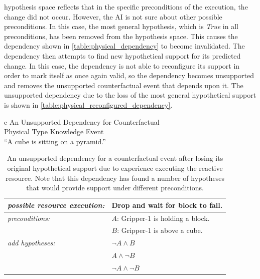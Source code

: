 hypothesis space reflects that in the specific preconditions of the
execution, the change did not occur.  However, the AI is not sure
about other possible preconditions.  In this case, the most general
hypothesis, which is \emph{True} in all preconditions, has been
removed from the hypothesis space.  This causes the dependency shown
in {\mbox{\autoref{table:physical_dependency}}} to become invalidated.
The dependency then attempts to find new hypothetical support for its
predicted change.  In this case, the dependency is not able to
reconfigure its support in order to mark itself as once again valid,
so the dependency becomes unsupported and removes the unsupported
counterfactual event that depends upon it.  The unsupported dependency
due to the loss of the most general hypothetical support is shown in
{\mbox{\autoref{table:physical_reconfigured_dependency}}}.
\begin{table}[h]
\centering
\begin{tabular}{c}
  An Unsupported Dependency for Counterfactual \\
  Physical Type Knowledge Event \\
  ``A cube is sitting on a pyramid.'' \\
  \begin{tabular}{|p{3cm}|p{6cm}|}
    \hline
    \emph{possible resource execution:} & Drop and wait for block to fall. \\
    \hline
    \emph{preconditions:}               & $A$: Gripper-1 is holding a block. \\
                                        & $B$: Gripper-1 is above a cube. \\
    \hline
    \emph{add hypotheses:}              & ${\neg}A \wedge B$ \\
                                        & $A \wedge {\neg}B$ \\
                                        & ${\neg}A \wedge {\neg}B$ \\
    \hline
  \end{tabular}
\end{tabular}
\caption[An unsupported dependency for a counterfactual physical type
  knowledge event after losing its original hypothetical support and
  attempting to reconfigure new support.]{An unsupported dependency
  for a counterfactual event after losing its original hypothetical
  support due to experience executing the reactive resource.  Note
  that this dependency has found a number of hypotheses that would
  provide support under different preconditions.}
\label{table:physical_reconfigured_dependency}
\end{table}

